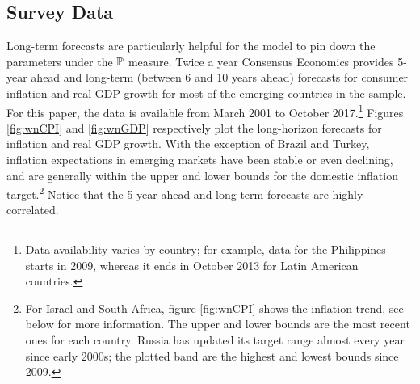 {%



\subsection{Survey Data} \label{sec:SurveyData}
\iftoggle{toclinks}{\gototoc}{} %

Long-term forecasts are particularly helpful for the model to pin down the parameters under the \(\mathbb{P}\) measure.
Twice a year Consensus Economics provides 5-year ahead and long-term (between 6 and 10 years ahead) forecasts for consumer inflation and real GDP growth for most of the emerging countries in the sample. 
For this paper, the data is available from March 2001 to October 2017.\footnote{ Data availability varies by country; for example, data for the Philippines starts in 2009, whereas it ends in October 2013 for Latin American countries.}
Figures \ref{fig:wnCPI} and \ref{fig:wnGDP} respectively plot the long-horizon forecasts for inflation and real GDP growth.
With the exception of Brazil and Turkey, inflation expectations in emerging markets have been stable or even declining, and are generally within the upper and lower bounds for the domestic inflation target.\footnote{ For Israel and South Africa, figure \ref{fig:wnCPI} shows the inflation trend, see below for more information. The upper and lower bounds are the most recent ones for each country. Russia has updated its target range almost every year since early 2000s; the plotted band are the highest and lowest bounds since 2009.}
Notice that the 5-year ahead and long-term forecasts are highly correlated.


}
